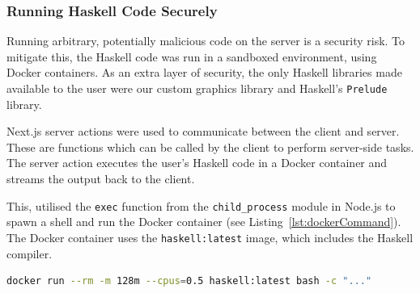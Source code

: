 \documentclass[../main.tex]{subfiles}
\begin{document}
            \subsubsection{Running Haskell Code Securely}
                Running arbitrary, potentially malicious code on the server is a security risk.
                To mitigate this, the Haskell code was run in a sandboxed environment, using
                    Docker containers.
                As an extra layer of security, the only Haskell libraries made available to the
                    user were our custom graphics library and Haskell's \texttt{Prelude} library.

                Next.js server actions were used to communicate between the client and server.
                These are functions which can be called by the client to perform server-side
                    tasks.
                The server action executes the user's Haskell code in a Docker container and
                    streams the output back to the client.

                This, utilised the \texttt{exec} function from the \texttt{child\_process}
                    module in Node.js to spawn a shell and run the Docker container (see
                    Listing~\ref{lst:dockerCommand}).
                The Docker container uses the \texttt{haskell:latest} image, which includes the
                    Haskell compiler.

                \begin{lstlisting}[language={bash}, label={lst:dockerCommand}, caption={The command 
                    used to run the Haskell code in a Docker container.
                    The \texttt{--rm} flag ensures the container is properly disposed of after running, 
                    the \texttt{-m 128m} flag limits the container to 128 MB of memory, and the 
                    \texttt{--cpus=0.5} flag limits the container to half a CPU core.
                    The \texttt{bash -c "..."} part executes a command inside the container.
                    This command is a simple script to write the user's program and the graphics
                        library to appropriate files, compile them using GHC, and run the resulting
                        executable.
                    All code was sent as a base64-encoded string to prevent special characters from
                        escaping the command, posing a security risk.}] 
docker run --rm -m 128m --cpus=0.5 haskell:latest bash -c "..."\end{lstlisting}
\end{document}
